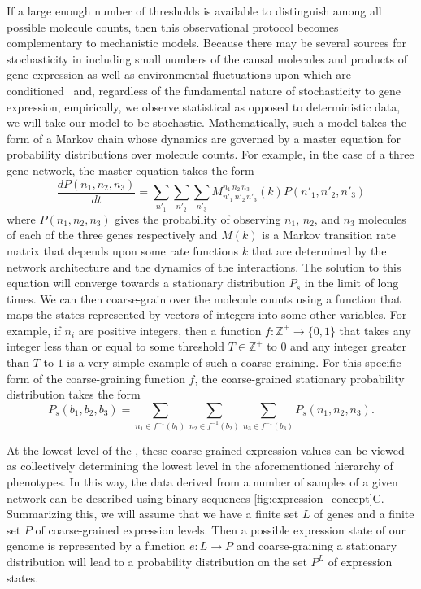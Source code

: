 If a large enough number of thresholds is available to distinguish among all possible molecule counts, then this observational protocol becomes complementary to mechanistic models.  Because there may be several sources for stochasticity in \gnpm{} including small numbers of the causal molecules and products of gene expression as well as environmental fluctuations upon which \gnpm{} are conditioned~\cite{Swain2002,Paulsson2004,Thattai2004,Acar2008a,Lestas2010,Munsky2012,Chalancon2012,Neuert2013,Sanchez2013} and, regardless of the fundamental nature of stochasticity to gene expression, empirically, we observe statistical as opposed to deterministic data, we will take our model to be stochastic.  Mathematically, such a model takes the form of a Markov chain whose dynamics are governed by a master equation for probability distributions over molecule counts.   For example, in the case of a three gene network, the master equation takes the form
$$
\frac{dP(n_1,n_2,n_3)}{dt} = \sum_{n'_1}\sum_{n'_2}\sum_{n'_3} M^{n_1\,n_2\,n_3}_{n'_1\,n'_2\,n'_3}(k) P(n'_1,n'_2,n'_3)
$$
where $P(n_1,n_2,n_3)$ gives the probability of observing $n_1$, $n_2$, and $n_3$ molecules of each of the three genes respectively and $M(k)$ is a Markov transition rate matrix that depends upon some rate functions $k$ that are determined by the network architecture and the dynamics of the interactions.  The solution to this equation will converge towards  a stationary distribution $P_s$ in the limit of long times. We can then coarse-grain over the molecule counts using a function that maps the states represented by vectors of integers into some other variables. For example, if $n_i$ are positive integers, then a function $f \colon \mathbb{Z}^+ \rightarrow \{0,1\}$ that takes any integer less than or equal to some threshold $T \in \mathbb{Z}^+$ to $0$ and any integer greater than $T$ to $1$ is a very simple example of such a coarse-graining. For this specific form of the coarse-graining function $f$, the coarse-grained stationary probability distribution takes the form
$$
P_s(b_1,b_2,b_3) = \sum_{n_1 \in f^{-1}(b_1)}\sum_{n_2 \in f^{-1}(b_2)}\sum_{n_3 \in f^{-1}(b_3)} P_s(n_1,n_2,n_3).
$$

At the lowest-level of the \gnpm{}, these coarse-grained expression values can be viewed as collectively determining the lowest level in the aforementioned hierarchy of phenotypes. In this way, the data derived from a number of samples of a given network can be described using binary sequences \ref{fig:expression_concept}C.  Summarizing this, we will assume that we have a finite set $L$ of genes and a finite set $P$ of coarse-grained expression levels.   Then a possible expression state of our genome is represented by a function $e : L \to P$ and coarse-graining a stationary distribution will lead to a probability distribution on the set $P^L$ of expression states.

